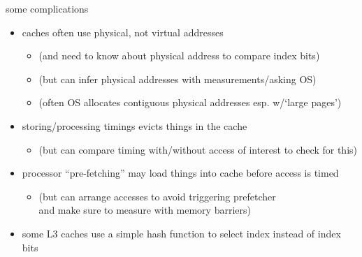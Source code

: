 \begin{frame}{some complications}
    \begin{itemize}
    \item caches often use physical, not virtual addresses
        \begin{itemize}
        \item (and need to know about physical address to compare index bits)
        \item (but can infer physical addresses with measurements/asking OS)
        \item (often OS allocates contiguous physical addresses esp. w/`large pages')
        \end{itemize}
    \item storing/processing timings evicts things in the cache
        \begin{itemize}
        \item (but can compare timing with/without access of interest to check for this)
        \end{itemize}
    \item processor ``pre-fetching'' may load things into cache before access is timed
        \begin{itemize}
            \item (but can arrange accesses to avoid triggering prefetcher \\
                and make sure to measure with memory barriers)
        \end{itemize}
    \item some L3 caches use a simple hash function to select index instead of  index bits
    \end{itemize}
\end{frame}

